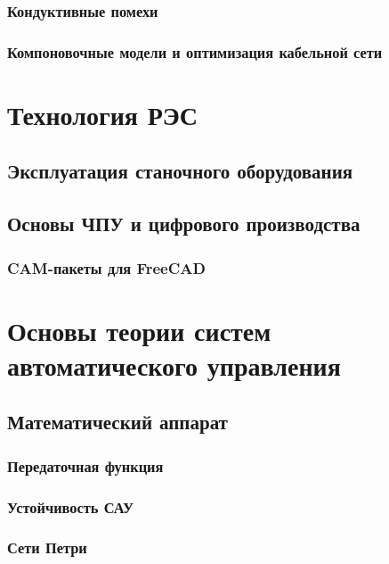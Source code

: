 \section{Кондуктивные помехи}

\section{Компоновочные модели и оптимизация кабельной сети}

\part{Технология РЭС}







\chapter{Эксплуатация станочного оборудования}

\chapter{Основы ЧПУ и цифрового производства}

\section{CAM-пакеты для FreeCAD}

\part{Основы теории систем автоматического управления}

\chapter{Математический аппарат}

\section{Передаточная функция}

\section{Устойчивость САУ}

\section{Сети Петри}

